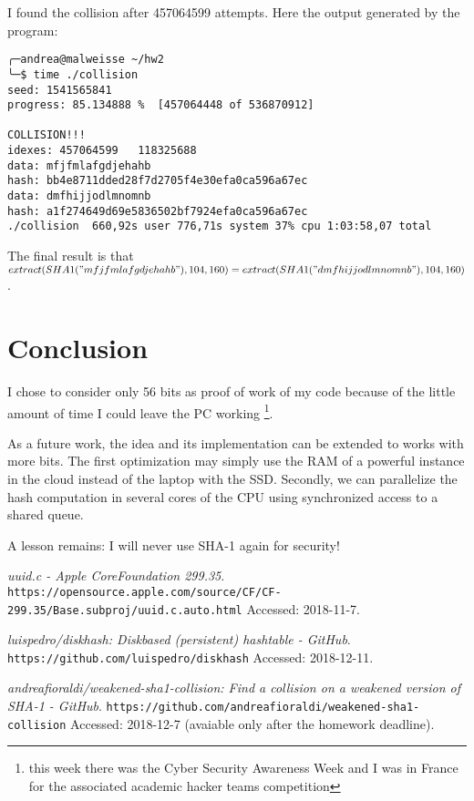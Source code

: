 \documentclass[11pt]{article}
\begin{document}
I found the collision after 457064599 attempts. Here the output generated by the program:

\begin{verbatim}
╭─andrea@malweisse ~/hw2  
╰─$ time ./collision                     
seed: 1541565841
progress: 85.134888 %  [457064448 of 536870912]

COLLISION!!!
idexes: 457064599   118325688
data: mfjfmlafgdjehahb
hash: bb4e8711dded28f7d2705f4e30efa0ca596a67ec
data: dmfhijjodlmnomnb
hash: a1f274649d69e5836502bf7924efa0ca596a67ec
./collision  660,92s user 776,71s system 37% cpu 1:03:58,07 total
\end{verbatim}

The final result is that $extract(SHA1("mfjfmlafgdjehahb"), 104, 160) = extract(SHA1("dmfhijjodlmnomnb"), 104, 160)$.

\section{Conclusion}

I chose to consider only 56 bits as proof of work of my code because of the little amount of time I could leave the PC working \footnote{this week there was the Cyber Security Awareness Week and I was in France for the associated academic hacker teams competition}.

As a future work, the idea and its implementation can be extended to works with more bits. The first optimization may simply use the RAM of a powerful instance in the cloud instead of the laptop with the SSD. Secondly, we can parallelize the hash computation in several cores of the CPU using synchronized access to a shared queue.

A lesson remains: I will never use SHA-1 again for security!

\vfill

\begin{thebibliography}{99}

{\em uuid.c - Apple CoreFoundation 299.35}.
  \verb|https://opensource.apple.com/source/CF/CF-299.35/Base.subproj/uuid.c.auto.html|
  \newblock Accessed: 2018-11-7.

{\em luispedro/diskhash: Diskbased (persistent) hashtable - GitHub}.
  \verb|https://github.com/luispedro/diskhash|
  \newblock Accessed: 2018-12-11.

{\em andreafioraldi/weakened-sha1-collision: Find a collision on a weakened version of SHA-1 - GitHub}.
  \verb|https://github.com/andreafioraldi/weakened-sha1-collision|
  \newblock Accessed: 2018-12-7 (avaiable only after the homework deadline).

\end{thebibliography}
\end{document}
